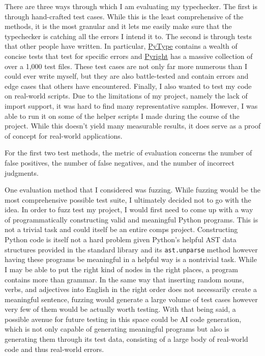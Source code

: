 \documentclass[10pt,twocolumn]{article}
\begin{document}
There are three ways through which I am evaluating my typechecker. The first is through hand-crafted test cases. While this is the least comprehensive of the methods, it is the most granular and it lets me easily make sure that the typechecker is catching all the errors I intend it to. The second is through tests that other people have written. In particular, \href{https://github.com/google/pytype/tree/main/pytype/tests}{PyType} contains a wealth of concise tests that test for specific errors and \href{https://github.com/microsoft/pyright/tree/main/packages/pyright-internal/src/tests/samples}{Pyright} has a massive collection of over a 1,000 test files. These test cases are not only far more numerous than I could ever write myself, but they are also battle-tested and contain errors and edge cases that others have encountered. Finally, I also wanted to test my code on real-world scripts. Due to the limitations of my project, namely the lack of import support, it was hard to find many representative samples. However, I was able to run it on some of the helper scripts I made during the course of the project. While this doesn't yield many measurable results, it does serve as a proof of concept for real-world applications.

For the first two test methods, the metric of evaluation concerns the number of false positives, the number of false negatives, and the number of incorrect judgments.

One evaluation method that I considered was fuzzing. While fuzzing would be the most comprehensive possible test suite, I ultimately decided not to go with the idea. In order to fuzz test my project, I would first need to come up with a way of programmatically constructing valid and meaningful Python programs. This is not a trivial task and could itself be an entire comps project. Constructing Python code is itself not a hard problem given Python's helpful AST data structures provided in the standard library and its \verb|ast.unparse| method however having these programs be meaningful in a helpful way is a nontrivial task. While I may be able to put the right kind of nodes in the right places, a program contains more than grammar. In the same way that inserting random nouns, verbs, and adjectives into English in the right order does not necessarily create a meaningful sentence, fuzzing would generate a large volume of test cases however very few of them would be actually worth testing. With that being said, a possible avenue for future testing in this space could be AI code generation, which is not only capable of generating meaningful programs but also is generating them through its test data, consisting of a large body of real-world code and thus real-world errors. 
\end{document}
